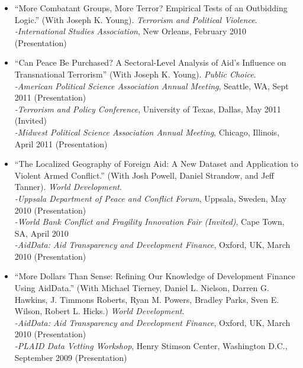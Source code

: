 \documentclass[10pt]{article}
\begin{document}
\begin{itemize}
\item ``More Combatant Groups, More Terror? Empirical Tests of an Outbidding Logic.'' (With Joseph K. Young). \textit{Terrorism and Political Violence}. 
	\\ \indent \textit{-International Studies Association}, New Orleans, February 2010 (Presentation)

\item ``Can Peace Be Purchased? A Sectoral-Level Analysis of Aid's Influence on Transnational Terrorism'' (With Joseph K. Young). \textit{Public Choice}.
	 \\ \indent \textit{-American Political Science Association Annual Meeting}, Seattle, WA, Sept 2011 (Presentation)
	 \\ \indent \textit{-Terrorism and Policy Conference}, University of Texas, Dallas, May 2011 (Invited)
	 \\ \indent \textit{-Midwest Political Science Association Annual Meeting}, Chicago, Illinois, April 2011 (Presentation)

\item ``The Localized Geography of Foreign Aid: A New Dataset and Application to Violent Armed Conflict.'' (With Josh Powell, Daniel Strandow, and Jeff Tanner). \textit{World Development}.
	\\ \indent \textit{-Uppsala Department of Peace and Conflict Forum}, Uppsala, Sweden, May 2010 (Presentation)
	\\ \indent \textit{-World Bank Conflict and Fragility Innovation Fair (Invited)}, Cape Town, SA, April 2010 %
	\\ \indent \textit{-AidData: Aid Transparency and Development Finance}, Oxford, UK, March 2010 (Presentation)
	
\item ``More Dollars Than Sense: Refining Our Knowledge of Development Finance Using AidData.'' (With Michael Tierney, Daniel L. Nielson, Darren G. Hawkins, J. Timmons Roberts, Ryan M. Powers, Bradley Parks, Sven E. Wilson, Robert L. Hicks.) \textit{World Development}. 
	\\ \indent \textit{-AidData: Aid Transparency and Development Finance}, Oxford, UK, March 2010 (Presentation)
	\\ \indent \textit{-PLAID Data Vetting Workshop}, Henry Stimson Center, Washington D.C., September 2009 (Presentation)


\end{itemize}
\end{document}
